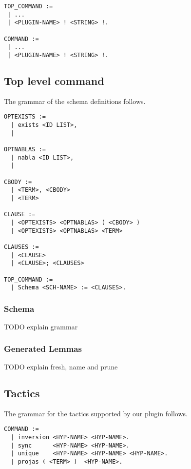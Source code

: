 \documentclass[nocopyrightspace,authoryear]{sigplanconf}
\begin{document}
\begin{lstlisting}
TOP_COMMAND :=
 | ...
 | <PLUGIN-NAME> ! <STRING> !.

COMMAND :=
 | ...
 | <PLUGIN-NAME> ! <STRING> !.
\end{lstlisting}



\subsection{Top level command}
The grammar of the schema definitions follows.

\begin{lstlisting}
OPTEXISTS :=
  | exists <ID LIST>, 
  |

OPTNABLAS :=
  | nabla <ID LIST>,
  |

CBODY :=
  | <TERM>, <CBODY>
  | <TERM>

CLAUSE :=
  | <OPTEXISTS> <OPTNABLAS> ( <CBODY> )
  | <OPTEXISTS> <OPTNABLAS> <TERM>

CLAUSES :=
  | <CLAUSE>
  | <CLAUSE>; <CLAUSES>

TOP_COMMAND :=
  | Schema <SCH-NAME> := <CLAUSES>.
\end{lstlisting} 

\subsubsection{Schema}
TODO explain grammar

\begin{comment}
We restrict the quantification of variables in the formulas to a series of existential quantifiers ($\exists$) followed by $\nabla$s.

N-ary context relations are represented using n lists of formulas, each clause corresponding to a constructor stating that, given such context relations, adding the formulas in the clauses in front of their respective list relate the extended lists. An additional constructor corresponding relating empty contexts is added to every context relation.
\end{comment}

\subsubsection{Generated Lemmas}
TODO explain fresh, name and prune

\subsection{Tactics}
The grammar for the tactics supported by our plugin follows.
\begin{lstlisting}
COMMAND :=
  | inversion <HYP-NAME> <HYP-NAME>.
  | sync      <HYP-NAME> <HYP-NAME>.
  | unique    <HYP-NAME> <HYP-NAME> <HYP-NAME>.
  | projas ( <TERM> )  <HYP-NAME>.
\end{lstlisting}
\end{document}
